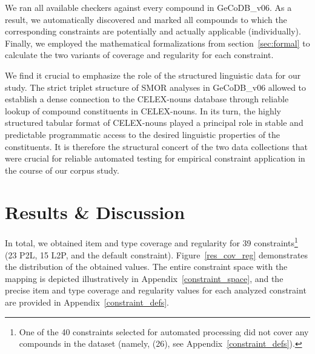 \documentclass[10pt, a4paper]{article}
\begin{document}




We ran all available checkers against every compound in GeCoDB\_v06. As a result, we automatically discovered and marked all compounds to which the corresponding constraints are potentially and actually applicable (individually). Finally, we employed the mathematical formalizations from section~\ref{sec:formal} to calculate the two variants of coverage and regularity for each constraint.


We find it crucial to emphasize the role of the structured linguistic data for our study. The strict triplet structure of SMOR analyses in GeCoDB\_v06 allowed to establish a dense connection to the CELEX-nouns database through reliable lookup of compound constituents in CELEX-nouns. In its turn, the highly structured tabular format of CELEX-nouns played a principal role in stable and predictable programmatic access to the desired linguistic properties of the constituents. It is therefore the structural concert of the two data collections that were crucial for reliable automated testing for empirical constraint application in the course of our corpus study.


\section{Results \& Discussion}
\label{sec:res}

In total, we obtained item and type coverage and regularity for 39 constraints\footnote{One of the 40 constraints selected for automated processing did not cover any compounds in the dataset (namely, (26), see Appendix~\ref{constraint_defs}).} (23 P2L, 15 L2P, and the default constraint). Figure~\ref{res_cov_reg} demonstrates the distribution of the obtained values. The entire constraint space with the mapping is depicted illustratively in Appendix~\ref{constraint_space}, and the precise item and type coverage and regularity values for each analyzed constraint are provided in Appendix~\ref{constraint_defs}.
\end{document}
